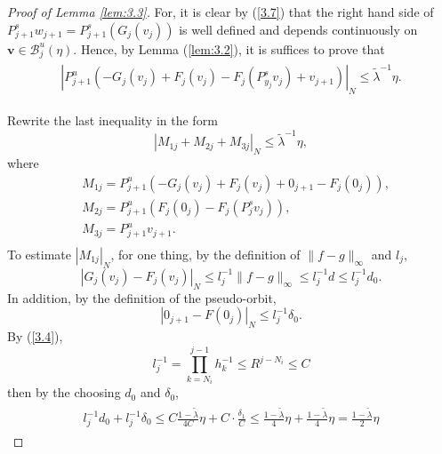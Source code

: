 \documentclass[10pt,a4paper]{amsart}
\begin{document}
	\begin{proof}[Proof of Lemma \ref{lem:3.3}]
		For, it is clear by (\ref{3.7}) that the right hand side of $ P_{j+1}^{s}w_{j+1}=P_{j+1}^{s}(G_{j}(v_{j})) $ is well
		defined and depends continuously on $ \boldsymbol{v}\in \mathcal{B}_{j}^{u}(\eta) $. Hence, by Lemma (\ref{lem:3.2}), it is suffices to prove that
		\begin{align}\label{3.9}
			\begin{split}
				|P_{j+1}^{u}(-G_{j}(v_{j})+F_{j}(v_{j})-F_{j}(P_{y_{j}}^{s}v_{j})+v_{j+1})|_{N}\leqslant\widetilde\lambda^{-1}\eta.
			\end{split}
		\end{align}
		
		Rewrite the last inequality in the form
		$$
		|M_{1j}+M_{2j}+M_{3j}|_{N}\leqslant\widetilde\lambda^{-1}\eta,
		$$
		where$$
		\begin{aligned}
			&M_{1j}=P_{j+1}^{u}(-G_{j}(v_{j})+F_{j}(v_{j})+0_{j+1}-F_{j}(0_{j})),  \\
			&M_{2j}=P_{j+1}^{u}(F_{j}(0_{j})-F_{j}(P_{j}^{s}v_{j})), \\
			&M_{3j}=P_{j+1}^{u}v_{j+1}.  \\
		\end{aligned}$$
		To estimate $ |M_{1j}|_{N} $, for one thing, by the definition of $ \|f - g\|_\infty $ and $ l_{j} $,
		$$ |G_{j}(v_{j})-F_{j}(v_{j})|_{N}\leqslant l_{j}^{-1}\|f - g\|_\infty\leqslant l_{j}^{-1}d\leqslant l_{j}^{-1}d_0. $$
		In addition, by the definition of the pseudo-orbit, $$\left|0_{j+1}-F\left(0_j\right)\right|_{N}
		\leq l^{-1}_j\delta_{0}.$$
		By (\ref{3.4}), $$ l_{j}^{-1}=\prod_{k=N_{i}}^{j-1}h_{k}^{-1}\leqslant R^{j-N_{i}} \leqslant C $$
		then by the choosing $ d_0 $ and $ \delta_{0} $, 
		\begin{align} \label{3.10}
			\begin{split}
				l_{j}^{-1}d_0+l_{j}^{-1}\delta_{0}
				\leqslant C\frac{1-\widetilde{\lambda}}{4C}\eta+C\cdot\frac{\delta_{1} }{C} 
				\leqslant   \frac{1-\widetilde{\lambda}}{4}\eta+\frac{1-\widetilde{\lambda}}{4}\eta=\frac{1-\widetilde\lambda}{2}\eta
			\end{split}
		\end{align}
		

\end{proof}
\end{document}
